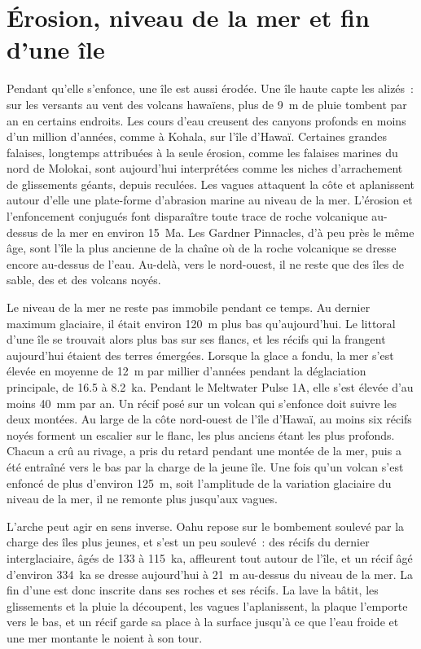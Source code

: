 \section{Érosion, niveau de la mer et fin d'une île}\label{sec:b2:oceanic-islands:erosion}

Pendant qu'elle s'enfonce, une île est aussi érodée. Une île haute capte les alizés~: sur les versants au vent
des volcans hawaïens, plus de \qty{9}{m} de pluie tombent par an en certains endroits. Les cours d'eau creusent
des canyons profonds en moins d'un million d'années, comme à Kohala, sur l'île d'Hawaï. Certaines grandes
falaises, longtemps attribuées à la seule érosion, comme les falaises marines du nord de Molokai, sont aujourd'hui
interprétées comme les niches d'arrachement de glissements géants, depuis reculées. Les vagues attaquent la côte et
aplanissent autour d'elle une plate-forme d'abrasion marine au niveau de la mer. L'érosion et l'enfoncement conjugués
font disparaître toute trace de roche volcanique au-dessus de la mer en environ \qty{15}{Ma}. Les Gardner Pinnacles,
d'à peu près le même âge, sont l'île la plus ancienne de la chaîne où de la roche volcanique se dresse encore
au-dessus de l'eau. Au-delà, vers le nord-ouest, il ne reste que des îles de sable, des  et des volcans noyés.

Le niveau de la mer ne reste pas immobile pendant ce temps. Au dernier maximum glaciaire, il était environ
\qty{120}{m} plus bas qu'aujourd'hui. Le littoral d'une île se trouvait alors plus bas sur ses flancs, et les récifs
qui la frangent aujourd'hui étaient des terres émergées. Lorsque la glace a fondu, la mer s'est élevée en moyenne de
\qty{12}{m} par millier d'années pendant la déglaciation principale, de 16.5 à \qty{8.2}{ka}. Pendant le Meltwater
Pulse 1A, elle s'est élevée d'au moins \qty{40}{mm} par an. Un récif posé sur un volcan qui s'enfonce doit suivre les
deux montées. Au large de la côte nord-ouest de l'île d'Hawaï, au moins six récifs noyés forment un escalier sur le
flanc, les plus anciens étant les plus profonds. Chacun a crû au rivage, a pris du retard pendant une montée de la mer,
puis a été entraîné vers le bas par la charge de la jeune île. Une fois qu'un volcan s'est enfoncé de plus d'environ
\qty{125}{m}, soit l'amplitude de la variation glaciaire du niveau de la mer, il ne remonte plus jusqu'aux vagues.

L'arche peut agir en sens inverse. Oahu repose sur le bombement soulevé par la charge des îles plus jeunes,
et s'est un peu soulevé~: des récifs du dernier interglaciaire, âgés de 133 à \qty{115}{ka}, affleurent
tout autour de l'île, et un récif âgé d'environ \qty{334}{ka} se dresse aujourd'hui à \qty{21}{m} au-dessus
du niveau de la mer. La fin d'une  est donc inscrite dans ses roches et ses récifs. La lave la
bâtit, les glissements et la pluie la découpent, les vagues l'aplanissent, la plaque l'emporte vers le bas,
et un récif garde sa place à la surface jusqu'à ce que l'eau froide et une mer montante le noient à son tour.

